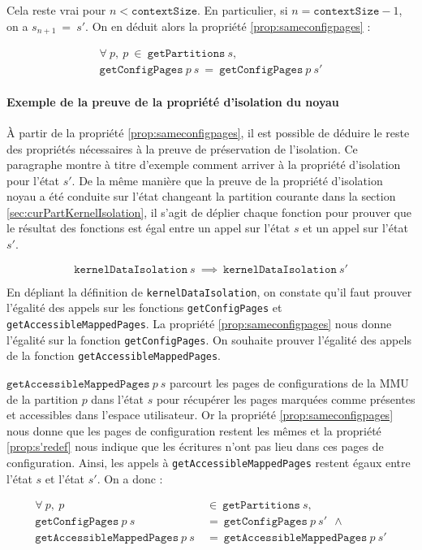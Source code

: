 			Cela reste vrai pour $n < \mathtt{contextSize}$. En particulier, si $n = \mathtt{contextSize} - 1$, on a $s_{n+1}~=~s'$. On en déduit alors la propriété \ref{prop:sameconfigpages} :

			\vspace{-0.25cm}
			\begin{gather*}
				\forall~p,~p~\in~\mathtt{getPartitions}~s,\\
				\mathtt{getConfigPages}~p~s~=~\mathtt{getConfigPages}~p~s'
			\end{gather*}

			\paragraph{Exemple de la preuve de la propriété d'isolation du noyau} À partir de la propriété \ref{prop:sameconfigpages}, il est possible de déduire le reste des propriétés nécessaires à la preuve de préservation de l'isolation. Ce paragraphe montre à titre d'exemple comment arriver à la propriété d'isolation pour l'état $s'$. De la même manière que la preuve de la propriété d'isolation noyau a été conduite sur l'état changeant la partition courante dans la section \ref{sec:curPartKernelIsolation}, il s'agit de déplier chaque fonction pour prouver que le résultat des fonctions est égal entre un appel sur l'état $s$ et un appel sur l'état $s'$.

			$$\mathtt{kernelDataIsolation}~s~\implies~\mathtt{kernelDataIsolation}~s'$$

			En dépliant la définition de \texttt{kernelDataIsolation}, on constate qu'il faut prouver l'égalité des appels sur les fonctions \texttt{getConfigPages} et \texttt{getAccessibleMappedPages}. La propriété \ref{prop:sameconfigpages} nous donne l'égalité sur la fonction \texttt{getConfigPages}. On souhaite prouver l'égalité des appels de la fonction \texttt{getAccessibleMappedPages}.

			$\mathtt{getAccessibleMappedPages}~p~s$ parcourt les pages de configurations de la MMU de la partition $p$ dans l'état $s$ pour récupérer les pages marquées comme présentes et accessibles dans l'espace utilisateur. Or la propriété \ref{prop:sameconfigpages} nous donne que les pages de configuration restent les mêmes et la propriété \ref{prop:s'redef} nous indique que les écritures n'ont pas lieu dans ces pages de configuration. Ainsi, les appels à \texttt{getAccessibleMappedPages} restent égaux entre l'état $s$ et l'état $s'$. On a donc :

			\begin{align*}
				\forall~p,~p&\in~\mathtt{getPartitions}~s,\\
				\mathtt{getConfigPages}~p~s~&=~\mathtt{getConfigPages}~p~s'~~\wedge\\
				\mathtt{getAccessibleMappedPages}~p~s~&=~\mathtt{getAccessibleMappedPages}~p~s'
			\end{align*}

